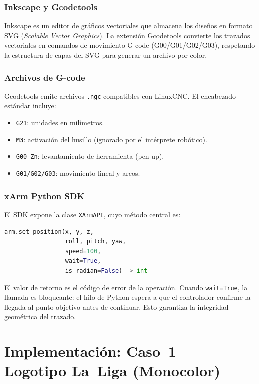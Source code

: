 \documentclass[journal,compsoc]{IEEEtran}
\begin{document}
\subsubsection{Inkscape y Gcodetools}
Inkscape es un editor de gráficos vectoriales que almacena los diseños en formato SVG (\textit{Scalable Vector Graphics}). La extensión Gcodetools convierte los trazados vectoriales en comandos de movimiento G-code (G00/G01/G02/G03), respetando la estructura de capas del SVG para generar un archivo por color.

\subsubsection{Archivos de G-code}
Gcodetools emite archivos \texttt{.ngc} compatibles con LinuxCNC. El encabezado estándar incluye:
\begin{itemize}
    \item \texttt{G21}: unidades en milímetros.
    \item \texttt{M3}: activación del husillo (ignorado por el intérprete robótico).
    \item \texttt{G00 Zn}: levantamiento de herramienta (pen-up).
    \item \texttt{G01/G02/G03}: movimiento lineal y arcos.
\end{itemize}

\subsubsection{xArm Python SDK}
El SDK expone la clase \texttt{XArmAPI}, cuyo método central es:
\begin{lstlisting}[language=Python, caption=Firma del método de posicionamiento cartesiano.]
arm.set_position(x, y, z,
                 roll, pitch, yaw,
                 speed=100,
                 wait=True,
                 is_radian=False) -> int
\end{lstlisting}
El valor de retorno es el código de error de la operación. Cuando \texttt{wait=True}, la llamada es bloqueante: el hilo de Python espera a que el controlador confirme la llegada al punto objetivo antes de continuar. Esto garantiza la integridad geométrica del trazado.

\section{Implementación: Caso~1 --- Logotipo La~Liga (Monocolor)}
\end{document}
